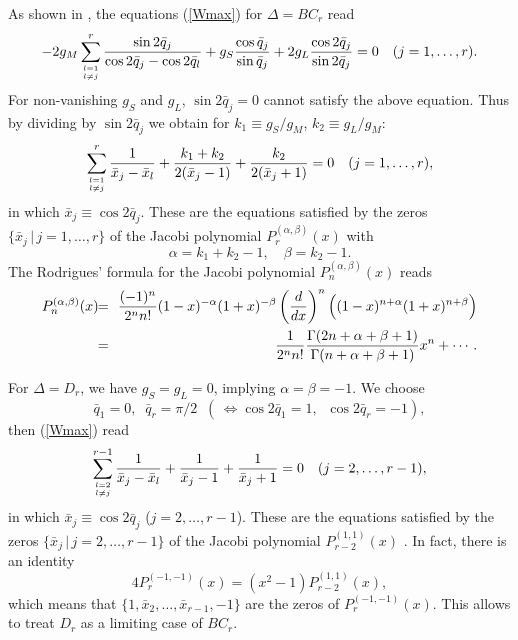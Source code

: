 \documentclass[a4paper,12pt]{article}
\begin{document}
As shown in \cite{cs}, the equations (\ref{Wmax}) for $\Delta=BC_r$ read
\begin{equation}
   -2g_M\sum_{l=1\atop l\ne j}^r{\sin2\bar{q}_j\over
   {\cos2\bar{q}_j-\cos2\bar{q}_l}}+g_S{\cos\bar{q}_j\over{\sin \bar{q}_j}}
   +2g_L{\cos2\bar{q}_j\over{\sin2\bar{q}_j}}=0 \quad(j=1,\ldots,r).
\end{equation}
For non-vanishing $g_S$ and $g_L$, $\sin2\bar{q}_j=0$ cannot satisfy
the above equation. Thus by dividing by $\sin2\bar{q}_j$ we obtain for
$k_1\equiv g_S/g_M$, $k_2\equiv g_L/g_M$:
\begin{equation}
   \sum_{l=1\atop l\ne j}^r{1\over{\bar{x}_j-\bar{x}_l}}+
   {k_1+k_2\over{2(\bar{x}_j-1)}}
   +{k_2\over{2(\bar{x}_j+1)}}=0 \quad(j=1,\ldots,r),
\end{equation}
in which $\bar{x}_j\equiv\cos2\bar{q}_j$.
These are the equations satisfied by the zeros
$\{\bar{x}_j\,|\,j=1,\ldots,r\}$ of the Jacobi polynomial
$P_r^{(\alpha,\beta)}(x)$ \cite{szego} with
\begin{equation}
   \alpha=k_1+k_2-1, \quad \beta=k_2-1.
\end{equation}
The Rodrigues' formula for the Jacobi polynomial $P_n^{(\alpha,\beta)}(x)$
reads
\begin{eqnarray}
   P_n^{(\alpha,\beta)}(x)&\!\!=\!\!&
   {(-1)^n\over{2^nn!}}(1-x)^{-\alpha}(1+x)^{-\beta}
   \left({d\over{dx}}\right)^n\Bigl((1-x)^{n+\alpha}(1+x)^{n+\beta}\Bigr)\\
%
   &\!\!=\!\!&\frac{1}{2^nn!}
   \frac{\Gamma(2n+\alpha+\beta+1)}{\Gamma(n+\alpha+\beta+1)}x^n+\cdots.
   \nonumber
\end{eqnarray}

For $\Delta=D_r$, we have $g_S=g_L=0$, implying $\alpha=\beta=-1$. We choose
\[
   \bar{q}_1=0,\;\; \bar{q}_r=\pi/2\;\;(\,\Longleftrightarrow
   \cos2\bar{q}_1=1,\;\;\cos2\bar{q}_r=-1),
\]
then (\ref{Wmax}) read
\begin{equation}
   \sum_{l=2\atop l\ne j}^{r-1}
   {1\over{\bar{x}_j-\bar{x}_l}}+{1\over{\bar{x}_j-1}}
   +{1\over{\bar{x}_j+1}}=0 \quad (j=2,\ldots,r-1),
   \label{drroots}
\end{equation}
in which $\bar{x}_j\equiv\cos2\bar{q}_j$ ($j=2,\ldots,r-1$).
These are the equations satisfied by the zeros
$\{\bar{x}_j\,|\,j=2,\ldots,r-1\}$ of the Jacobi polynomial
$P_{r-2}^{(1,1)}(x)$ \cite{szego}. In fact, there is an identity
\begin{equation}
   4P_{r}^{(-1,-1)}(x)=(x^2-1)P_{r-2}^{(1,1)}(x),
   \label{jacobidr}
\end{equation}
which means that $\{1,\bar{x}_2,\ldots,\bar{x}_{r-1},-1\}$ are
the zeros of $P_r^{(-1,-1)}(x)$. This allows to treat $D_r$ as a limiting
case of $BC_r$.
\end{document}
